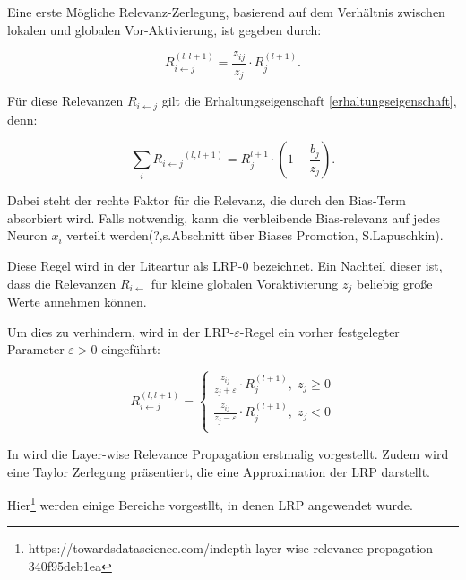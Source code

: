 \documentclass[twoside, 12pt,a4paper]{article}
\numberwithin{equation}{section}
\begin{document}
Eine erste Mögliche Relevanz-Zerlegung, basierend auf dem Verhältnis zwischen lokalen und globalen Vor-Aktivierung, ist gegeben durch:

\begin{equation}
	R_{i\leftarrow j}^{(l,l+1)} = \frac{z_{ij}}{z_j} \cdot R_j^{(l+1)}.
\end{equation}

Für diese Relevanzen $R_{i \leftarrow j}$ gilt die Erhaltungseigenschaft \ref{erhaltungseigenschaft}, denn:

\begin{equation}
	\sum_i{R_{i \leftarrow j}}^{(l,l+1)} = R_{j}^{l+1} \cdot (1-\frac{b_j}{z_j}).
\end{equation}

Dabei steht der rechte Faktor für die Relevanz, die durch den Bias-Term absorbiert wird.
Falls notwendig, kann die verbleibende Bias-relevanz auf jedes Neuron $x_i$ verteilt werden(?,s.Abschnitt über Biases Promotion, S.Lapuschkin).

Diese Regel wird in der Liteartur als LRP-0 bezeichnet.
Ein Nachteil dieser ist, dass die Relevanzen $R_{i \leftarrow}$ für kleine globalen Voraktivierung $z_j$ beliebig große Werte annehmen können.

Um dies zu verhindern, wird in der LRP-$\varepsilon$-Regel ein vorher festgelegter Parameter $\varepsilon > 0$ eingeführt:

\begin{equation}
	R_{i\leftarrow j}^{(l,l+1)} = \begin{cases}
	\frac{z_{ij}}{z_j +\varepsilon} \cdot R_j^{(l+1)}, \; z_j \geq 0\\
	\frac{z_{ij}}{z_j -\varepsilon}\cdot R_j^{(l+1)}, \; z_j < 0\\
	\end{cases}
\end{equation}


In \cite{LRP_first_paper} wird die Layer-wise Relevance Propagation erstmalig vorgestellt. Zudem wird eine Taylor Zerlegung präsentiert, die eine Approximation der LRP darstellt. 
	
	Hier\footnote{https://towardsdatascience.com/indepth-layer-wise-relevance-propagation-340f95deb1ea} werden einige Bereiche vorgestllt, in denen LRP angewendet wurde.
	
\end{document}
